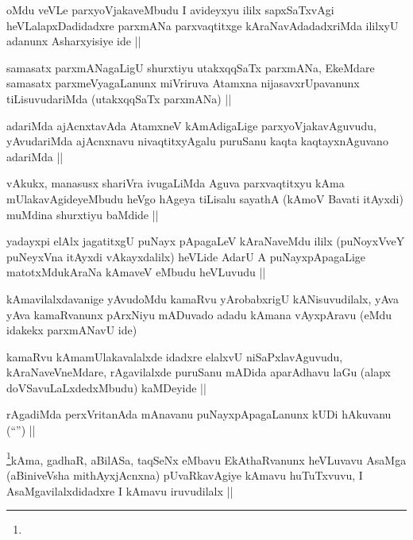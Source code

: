 \begin{artha}
oMdu veVLe parxyoVjakaveMbudu I avideyxyu ililx sapxSaTxvAgi
heVLalapxDadidadxre parxmANa parxvaqtitxge kAraNavAdadadxriMda ililxyU
adanunx Asharxyisiye ide ||
\end{artha}

\begin{artha}
samasatx parxmANagaLigU shurxtiyu utakxqqSaTx parxmANa, EkeMdare
samasatx parxmeVyagaLanunx miVriruva Atamxna nijasavxrUpavanunx
tiLisuvudariMda (utakxqqSaTx parxmANa) ||
\end{artha}

\begin{artha}
adariMda ajAcnxtavAda AtamxneV kAmAdigaLige parxyoVjakavAguvudu,
yAvudariMda ajAcnxnavu nivaqtitxyAgalu puruSanu kaqta kaqtayxnAguvano
adariMda ||
\end{artha}


\begin{artha}
vAkukx, manasusx shariVra ivugaLiMda Aguva parxvaqtitxyu kAma
mUlakavAgideyeMbudu heVgo hAgeya tiLisalu sayathA (kAmoV Bavati
itAyxdi) muMdina shurxtiyu baMdide || 
\end{artha}

\begin{artha}
yadayxpi elAlx jagatitxgU puNayx pApagaLeV kAraNaveMdu ililx
(puNoyxVveY puNeyxVna itAyxdi vAkayxdalilx) heVLide AdarU A
puNayxpApagaLige matotxMdukAraNa kAmaveV eMbudu heVLuvudu ||
\end{artha}

\begin{artha}
kAmavilalxdavanige yAvudoMdu kamaRvu yArobabxrigU kANisuvudilalx, yAva
yAva kamaRvanunx pArxNiyu mADuvado adadu kAmana vAyxpAravu (eMdu
idakekx parxmANavU ide)
\end{artha}

\begin{artha}
kamaRvu kAma\s mUlakavalalxde idadxre elalxvU niSaPxlavAguvudu,
kAraNaveVneMdare, rAgavilalxde puruSanu mADida aparAdhavu laGu (alapx
doVSavuLaLxdedxMbudu) kaMDeyide ||
\end{artha}

\begin{artha}
rAgadiMda perxVritanAda mAnavanu puNayxpApagaLanunx kUDi hAkuvanu
(``\stext'') ||
\end{artha}


\begin{artha}
\footnote{}kAma, gadhaR, aBilASa, taqSeNx eMbavu EkAthaRvanunx
heVLuvavu AsaMga (aBiniveVsha mithAyxjAcnxna) pUvaRkavAgiye kAmavu
huTuTxvuvu, I AsaMgavilalxdidadxre I kAmavu iruvudilalx ||
\end{artha}

